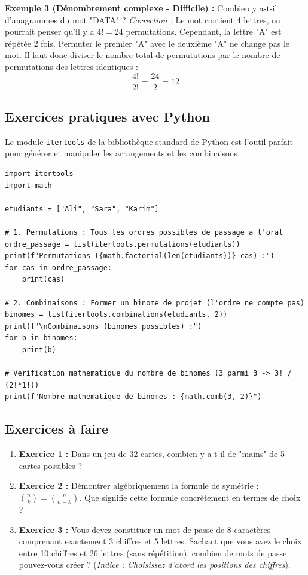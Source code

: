 \textbf{Exemple 3 (Dénombrement complexe - Difficile) :}
Combien y a-t-il d'anagrammes du mot "DATA" ?
\textit{Correction :} Le mot contient 4 lettres, on pourrait penser qu'il y a $4! = 24$ permutations. Cependant, la lettre "A" est répétée 2 fois. Permuter le premier "A" avec le deuxième "A" ne change pas le mot. Il faut donc diviser le nombre total de permutations par le nombre de permutations des lettres identiques :
$$ \frac{4!}{2!} = \frac{24}{2} = 12 $$

\subsection{Exercices pratiques avec Python}
Le module \texttt{itertools} de la bibliothèque standard de Python est l'outil parfait pour générer et manipuler les arrangements et les combinaisons. 

\begin{lstlisting}
import itertools
import math

etudiants = ["Ali", "Sara", "Karim"]

# 1. Permutations : Tous les ordres possibles de passage a l'oral
ordre_passage = list(itertools.permutations(etudiants))
print(f"Permutations ({math.factorial(len(etudiants))} cas) :")
for cas in ordre_passage:
    print(cas)

# 2. Combinaisons : Former un binome de projet (l'ordre ne compte pas)
binomes = list(itertools.combinations(etudiants, 2))
print(f"\nCombinaisons (binomes possibles) :")
for b in binomes:
    print(b)
    
# Verification mathematique du nombre de binomes (3 parmi 3 -> 3! / (2!*1!))
print(f"Nombre mathematique de binomes : {math.comb(3, 2)}")
\end{lstlisting}

\subsection{Exercices à faire}
\begin{enumerate}
    \item \textbf{Exercice 1 :} Dans un jeu de 32 cartes, combien y a-t-il de "mains" de 5 cartes possibles ?
    \item \textbf{Exercice 2 :} Démontrer algébriquement la formule de symétrie : $\binom{n}{k} = \binom{n}{n-k}$. Que signifie cette formule concrètement en termes de choix ?
    \item \textbf{Exercice 3 :} Vous devez constituer un mot de passe de 8 caractères comprenant exactement 3 chiffres et 5 lettres. Sachant que vous avez le choix entre 10 chiffres et 26 lettres (sans répétition), combien de mots de passe pouvez-vous créer ? (\textit{Indice : Choisissez d'abord les positions des chiffres}).
\end{enumerate}

